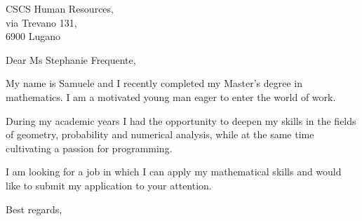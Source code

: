 \documentclass[11pt,a4paper,sans,italian]{letter}
\begin{document}
	\begin{letter}{CSCS Human Resources,\\ via Trevano 131, \\ 6900 Lugano}
	\opening{Dear Ms Stephanie Frequente,}
	\vspace{0.5cm}
	My name is Samuele and I recently completed my Master's degree in mathematics. I am a motivated young man eager to enter the world of work.

	During my academic years I had the opportunity to deepen my skills in the fields of geometry, probability and numerical analysis, while at the same time cultivating a passion for programming.

	I am looking for a job in which I can apply my mathematical skills and would like to submit my application to your attention.
	
	\closing{\vspace{1cm}\hspace{2cm}Best regards,}
	\end{letter}
\end{document}
